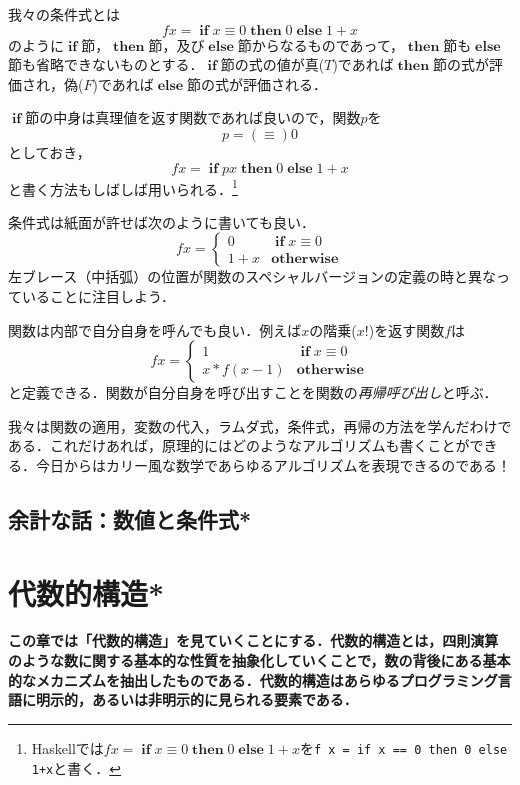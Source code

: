 \documentclass[twocolumn]{jsbook}
\newcommand{\keyword}[1]{{\emph{#1}}}
\newcommand{\code}[1]{\texttt{#1}}
\newenvironment{leader}{\begingroup\bf}{\endgroup}
\newcommand{\mathKeyword}[1]{\mathbf{#1}}
\DeclareMathOperator{\mathIf}{\mathKeyword{if}}
\DeclareMathOperator{\mathElse}{\mathKeyword{else}}
\DeclareMathOperator{\mathThen}{\mathKeyword{then}}
\newcommand{\mathOtherwise}{\mathKeyword{otherwise}}
\begin{document}
我々の条件式とは$$fx=\mathIf x\equiv0\mathThen0\mathElse1+x$$のように$\mathIf$節，$\mathThen$節，及び$\mathElse$節からなるものであって，$\mathThen$節も$\mathElse$節も省略できないものとする．$\mathIf$節の式の値が真($T$)であれば$\mathThen$節の式が評価され，偽($F$)であれば$\mathElse$節の式が評価される．

$\mathIf$節の中身は真理値を返す関数であれば良いので，関数$p$を$$p=(\equiv)0$$としておき，$$fx=\mathIf px\mathThen0\mathElse1+x$$と書く方法もしばしば用いられる．\footnote{Haskellでは$fx=\mathIf x\equiv0\mathThen0\mathElse1+x$を\code{f x = if x == 0 then 0 else 1+x}と書く．}

条件式は紙面が許せば次のように書いても良い．
\begin{equation*}
fx=\begin{cases}
0&\mathIf x\equiv0\\
1+x&\mathOtherwise
\end{cases}
\end{equation*}
左ブレース（中括弧）の位置が関数のスペシャルバージョンの定義の時と異なっていることに注目しよう．

関数は内部で自分自身を呼んでも良い．例えば$x$の階乗($x!$)を返す関数$f$は
\begin{equation*}
fx=\begin{cases}
1&\mathIf x\equiv0\\
x*f(x-1)&\mathOtherwise
\end{cases}
\end{equation*}
と定義できる．関数が自分自身を呼び出すことを関数の\keyword{再帰呼び出し}と呼ぶ．

我々は関数の適用，変数の代入，ラムダ式，条件式，再帰の方法を学んだわけである．これだけあれば，原理的にはどのようなアルゴリズムも書くことができる．今日からはカリー風な数学であらゆるアルゴリズムを表現できるのである！

\section{余計な話：数値と条件式*}


\chapter{代数的構造*}

\begin{leader}
この章では「代数的構造」を見ていくことにする．代数的構造とは，四則演算のような数に関する基本的な性質を抽象化していくことで，数の背後にある基本的なメカニズムを抽出したものである．代数的構造はあらゆるプログラミング言語に明示的，あるいは非明示的に見られる要素である．
\end{leader}
\end{document}
